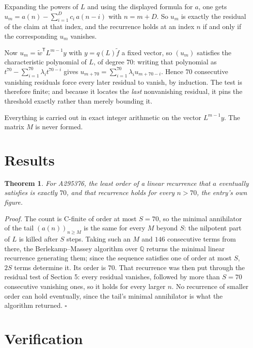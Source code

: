 \documentclass[11pt]{article}
\newtheorem{theorem}{Theorem}
\theoremstyle{definition}
\begin{document}
Expanding the powers of $L$ and using the displayed formula for $a$, one gets $u_m = a(n) - \sum_{i=1}^{D} c_i\,a(n-i)$ with $n = m + D$. So $u_m$ is exactly the residual of the claim at that index, and the recurrence holds at an index $n$ if and only if the corresponding $u_m$ vanishes.

Now $u_m = \tilde w^{\mathsf T} L^{m-1} y$ with $y = q(L)\tilde f$ a fixed vector, so $(u_m)$ satisfies the characteristic polynomial of $L$, of degree $70$: writing that polynomial as $t^{70} - \sum_{i=1}^{70} \lambda_i t^{70-i}$ gives $u_{m+70} = \sum_{i=1}^{70} \lambda_i u_{m+70-i}$. Hence $70$ consecutive vanishing residuals force every later residual to vanish, by induction. The test is therefore finite; and because it locates the {\itshape last} nonvanishing residual, it pins the threshold exactly rather than merely bounding it.

Everything is carried out in exact integer arithmetic on the vector $L^{m-1}y$. The matrix $M$ is never formed.

\section{Results}

\begin{theorem} For A295376, the least order of a linear recurrence that $a$ eventually satisfies is exactly $70$, and that recurrence holds for every $n > 70$, the entry's own figure.\end{theorem}

{\itshape Proof.} The count is C-finite of order at most $S = 70$, so the minimal annihilator of the tail $(a(n))_{n \ge M}$ is the same for every $M$ beyond $S$: the nilpotent part of $L$ is killed after $S$ steps. Taking such an $M$ and $146$ consecutive terms from there, the Berlekamp--Massey algorithm over $\mathbb{Q}$ returns the minimal linear recurrence generating them; since the sequence satisfies one of order at most $S$, $2S$ terms determine it. Its order is $70$. That recurrence was then put through the residual test of Section 5: every residual vanishes, followed by more than $S = 70$ consecutive vanishing ones, so it holds for every larger $n$. No recurrence of smaller order can hold eventually, since the tail's minimal annihilator is what the algorithm returned. $\square$

\section{Verification}
\end{document}

